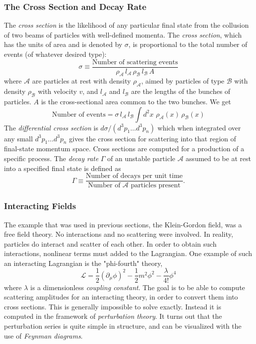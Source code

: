 \subsubsection{The Cross Section and Decay Rate}
\label{sec:cross-section}

The \emph{cross section} is the likelihood of any particular final state from the collusion of two beams of particles with well-defined momenta. The \emph{cross section}, which has the units of area and is denoted by $\sigma$, is proportional to the total number of events (of whatever desired type):
\begin{equation}
\sigma \equiv \frac{\text{Number of scattering events}}{\rho_\mathcal{A}\,l_\mathcal{A}\,\rho_\mathcal{B}\,l_\mathcal{B}\,A}
\end{equation}
where $\mathcal{A}$ are particles at rest with density $\rho_\mathcal{A}$, aimed by particles of type $\mathcal{B}$ with density $\rho_\mathcal{B}$ with velocity $v$, and $l_\mathcal{A}$ and $l_\mathcal{B}$ are the lengths of the bunches of particles. $A$ is the cross-sectional area common to the two bunches. We get
\begin{equation}
\text{Number of events} = \sigma\,l_\mathcal{A}\,l_\mathcal{B}\int d^2 x\,\, \rho_\mathcal{A}(x)\,\rho_\mathcal{B}(x)
\end{equation}
The \emph{differential cross section} is $d\sigma/(d^3 p_1\ldots d^3p_n)$ which when integrated over any small $d^3 p_1\ldots d^3p_n$ gives the cross section for scattering into that region of final-state momentum space. Cross sections are computed for a production of a specific process. The \emph{decay rate} $\Gamma$ of an unstable particle $\mathcal{A}$ assumed to be at rest into a specified final state is defined as
\begin{equation}
\Gamma \equiv \frac{\text{Number of decays per unit time}}{\text{Number of $\mathcal{A}$ particles present}}.
\end{equation}

\subsubsection{Interacting Fields}

The example that was used in previous sections, the Klein-Gordon field, was a free field theory. No interactions and no scattering were involved. In reality, particles do interact and scatter of each other. In order to obtain such interactions, nonlinear terms must added to the Lagrangian. One example of such an interacting Lagrangian is the "phi-fourth" theory,
\begin{equation}
\mathcal{L} = \frac{1}{2}(\partial_\mu\phi)^2-\frac{1}{2}m^2\phi^2 -\frac{\lambda}{4!}\phi^4
\end{equation}
where $\lambda$ is a dimensionless \emph{coupling constant}. The goal is to be able to compute scattering amplitudes for an interacting theory, in order to convert them into cross sections. This is generally impossible to solve exactly. Instead it is computed in the framework of \emph{perturbation theory}. It turns out that the perturbation series is quite simple in structure, and can be visualized with the use of \emph{Feynman diagrams}.

